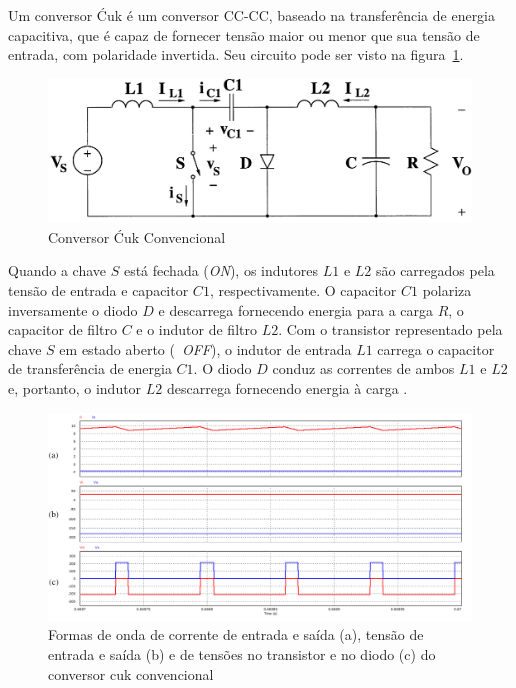 \documentclass[
	12pt,				%
	openright,			%
	twoside,			%
	a4paper,			%
	english,			%
	french,				%
	spanish,			%
	brazil,				%
	]{abntex2}
\begin{document}
Um conversor Ćuk é um conversor CC-CC, baseado na transferência de energia capacitiva, que é capaz de fornecer tensão maior ou menor que sua tensão de entrada, com polaridade invertida. Seu circuito pode ser visto na figura~\ref{fig:conv_cuk_circuit}. 

\begin{figure}[htbp]
	\centering
		\includegraphics[width=0.55 \linewidth]{conv_cuk_circuit}
		\caption{Conversor Ćuk Convencional \cite{RASHID_CUK}}
		\label{fig:conv_cuk_circuit}
\end{figure}


Quando a chave $S$ está fechada (\textit{ON}), os indutores $L1$ e $L2$ são carregados pela tensão de entrada e capacitor $C1$, respectivamente. O capacitor $C1$ polariza inversamente o diodo $D$ e descarrega fornecendo energia para a carga $R$, o capacitor de filtro $C$ e o indutor de filtro $L2$.
Com o transistor representado pela chave $S$ em estado aberto (~\textit{OFF}), o indutor de entrada $L1$ carrega o capacitor de transferência de energia $C1$. O diodo $D$ conduz as correntes de ambos $L1$ e $L2$ e, portanto, o indutor $L2$ descarrega fornecendo energia à carga \cite{RASHID_CUK} \cite{JOSEPH_2015_Intervealed_CUK}. 

\begin{figure}[H]
	\captionsetup{justification=centering}
	\centering
		\includegraphics[width= \linewidth]{conv_cuk_signal_details}
		\caption{Formas de onda de corrente de entrada e saída (a), tensão de entrada e saída (b) e de tensões no transistor e no diodo (c) do conversor cuk convencional}
		\label{fig:conv_cuk_In_Out}
\end{figure}
\end{document}
